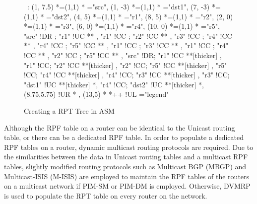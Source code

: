 \begin{figure}[Hp]
\label{fig:asm-rpt}

\begin{center}

\ \xy<1cm,0cm>:
(1, 7.5)  *=(1,1) 	  	*\frm{-}  ="src",
(1, -3)   *=(1,1) 	*\frm{-}  ="dst1",
(7, -3)   *=(1,1) 	*\frm{-}  ="dst2",
%
(4,  5)   *=(1,1)  *   ="r1",
(8,  5)   *=(1,1)  *   ="r2",
(2,  0)   *=(1,1)  *   ="r3",
(6,  0)   *=(1,1)  *   ="r4",
(10, 0)   *=(1,1)  *   ="r5",
%
"src" !DR ; "r1" !UC **\dir{~} ,
%
"r1" !CC ; "r2" !CC **\dir{~} ,
"r3" !CC ; "r4" !CC **\dir{~} ,
"r4" !CC ; "r5" !CC **\dir{~} ,
"r1" !CC ; "r3" !CC **\dir{~} ,
"r1" !CC ; "r4" !CC **\dir{~} ,
"r2" !CC ; "r5" !CC **\dir{~} ,
%
"src" !DR; "r1"   !CC **[thicker]\dir{=} ,
"r1"  !CC; "r2"   !CC **[thicker]\dir{=} ,
"r2"  !CC; "r5"   !CC **[thicker]\dir{=} ,
"r5"  !CC; "r4"   !CC **[thicker]\dir{=} ,
"r4"  !CC; "r3"   !CC **[thicker]\dir{=} ,
"r3"  !CC; "dst1" !UC **[thicker]\dir{=} *,
"r4"  !CC; "dst2" !UC **[thicker]\dir{=} *,
%
\POS (8.75,5.75) !UR * ,
%
\POS (13,5) * *++\frm{-} !UL ="legend"
\endxy

\end{center}

\caption{Creating a RPT Tree in ASM}

\end{figure}

\clearpage

Although the RPF table on a router can be identical to the Unicast
routing table, or there can be a dedicated RPF table. In order to 
populate a dedicated RPF tables on a router, dynamic multicast 
routing protocols are required. Due to the similarities between the data
in Unicast routing tables and a multicast RPF tables, slightly modified
routing protocols such as Multicast BGP (MBGP) and Multicast-ISIS
(M-ISIS) are employed to maintain the RPF tables of the routers on a
multicast network if PIM-SM or PIM-DM is employed. Otherwise, DVMRP is
used to populate the RPT table on every router on the network.


